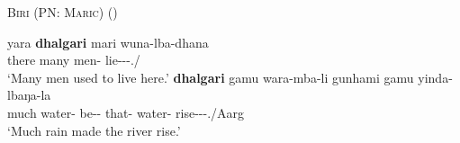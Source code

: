 \documentclass[12pt,egregdoesnotlikesansseriftitles]{scrartcl}
\begin{document}
\begin{exe}
  \ex \textsc{Biri (PN: Maric}) \hfill(\cite[54]{terrill98}) \label{manymuch1}
  \begin{xlist} 
    \ex \gll  yara    \textbf{dhalgari} mari  wuna-lba-dhana \\
    there  many    men-\Abs{} lie-\Cont-\Pst-\Tpl.\Sarg/\Aarg\\
    \glt `Many men used to live here.'
    \ex \gll \textbf{dhalgari} gamu wara-mba-li gunhami gamu yinda-lbaŋa-la\\
    much  water-\Abs{} be-\Caus-\Pst{} that-\Abs{}  water-\Abs{}  rise-\Cont-\Prs-\Tsg.\Sarg/Aarg\\
    \glt `Much rain made the river rise.'
  \end{xlist}
\end{exe}
\end{document}
